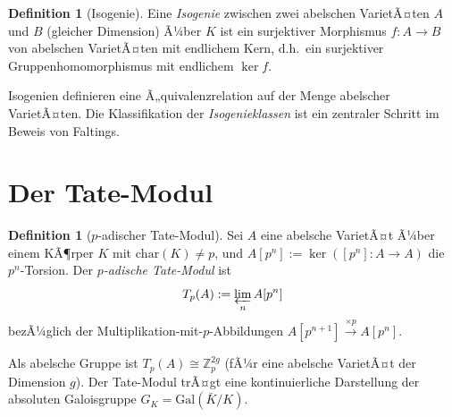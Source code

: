 ﻿\documentclass[12pt,a4paper]{article}
\theoremstyle{plain}
\theoremstyle{definition}
\newtheorem{definition}[theorem]{Definition}
\theoremstyle{remark}
\newcommand{\Z}{\mathbb{Z}}
\newcommand{\Gal}{\mathrm{Gal}}
\begin{document}
\begin{definition}[Isogenie]\label{def:isogenie}
Eine \emph{Isogenie} zwischen zwei abelschen VarietÃ¤ten $A$ und $B$ (gleicher Dimension)
Ã¼ber $K$ ist ein surjektiver Morphismus $f: A \to B$ von abelschen VarietÃ¤ten
mit endlichem Kern, d.h.\ ein surjektiver Gruppenhomomorphismus mit endlichem $\ker f$.
\end{definition}

Isogenien definieren eine Ã„quivalenzrelation auf der Menge abelscher VarietÃ¤ten.
Die Klassifikation der \emph{Isogenieklassen} ist ein zentraler Schritt im Beweis von Faltings.

\section{Der Tate-Modul}

\begin{definition}[$p$-adischer Tate-Modul]\label{def:tate}
Sei $A$ eine abelsche VarietÃ¤t Ã¼ber einem KÃ¶rper $K$ mit $\mathrm{char}(K) \neq p$, und
$A[p^n] := \ker([p^n]: A \to A)$ die $p^n$-Torsion. Der \emph{$p$-adische Tate-Modul} ist
\[
  T_p(A) := \varprojlim_{n} A[p^n]
\]
bezÃ¼glich der Multiplikation-mit-$p$-Abbildungen $A[p^{n+1}] \xrightarrow{\times p} A[p^n]$.
\end{definition}

Als abelsche Gruppe ist $T_p(A) \cong \Z_p^{2g}$ (fÃ¼r eine abelsche VarietÃ¤t der Dimension $g$).
Der Tate-Modul trÃ¤gt eine kontinuierliche Darstellung der absoluten Galoisgruppe
$G_K = \Gal(\bar K / K)$.
\end{document}
